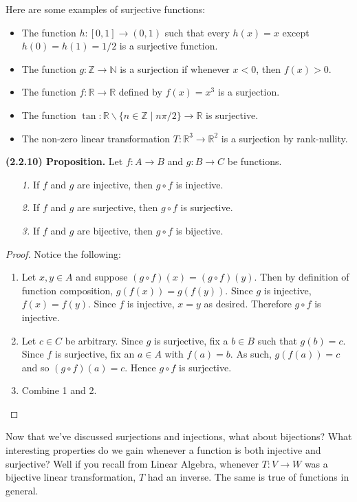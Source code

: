\documentclass[12pt]{book}
\def\N{{\mathbb{N}}}
\def\R{{\mathbb{R}}}
\def\Z{{\mathbb{Z}}}
\begin{document}
Here are some examples of surjective functions:
\begin{itemize}
\item The function $h\colon[0,1]\rightarrow(0,1)$ such that every $h(x)=x$ except $h(0)=h(1)=1/2$ is a surjective function. 
\item The function $g\colon\Z\rightarrow\N$ is a surjection if whenever $x<0$, then $f(x)>0$. 
\item The function $f\colon\R\rightarrow\R$ defined by $f(x)=x^3$ is a surjection.
\item The function $\tan\colon\R\backslash\{n\in\Z\mid n\pi/2\}\rightarrow\R$ is surjective.
\item The non-zero linear transformation $T:\R^3\rightarrow\R^2$ is a surjection by rank-nullity.
\end{itemize}

\noindent\textbf{(2.2.10) Proposition.} Let $f\colon A\rightarrow B$ and $g\colon B\rightarrow C$ be functions. 
\begin{enumerate}
\item[\textit{1.}] If $f$ and $g$ are injective, then $g\circ f$ is injective.
\item[\textit{2.}] If $f$ and $g$ are surjective, then $g\circ f$ is surjective.
\item[\textit{3.}] If $f$ and $g$ are bijective, then $g\circ f$ is bijective.
\end{enumerate}
\begin{proof} Notice the following:
\begin{enumerate}
\item Let $x,y\in A$ and suppose $(g\circ f)(x)=(g\circ f)(y)$. Then by definition of function composition, $g(f(x))=g(f(y))$. Since $g$ is injective, $f(x)=f(y)$. Since $f$ is injective, $x=y$ as desired. Therefore $g\circ f$ is injective.
\item Let $c\in C$ be arbitrary. Since $g$ is surjective, fix a $b\in B$ such that $g(b)=c$. Since $f$ is surjective, fix an $a\in A$ with $f(a)=b$. As such, $g(f(a))=c$ and so $(g\circ f)(a)=c$. Hence $g\circ f$ is surjective.
\item Combine 1 and 2.
\end{enumerate}\end{proof}


Now that we've discussed surjections and injections, what about bijections? What interesting properties do we gain whenever a function is both injective and surjective? Well if you recall from Linear Algebra, whenever $T:V\rightarrow W$ was a bijective linear transformation, $T$ had an inverse. The same is true of functions in general.\\
\end{document}
